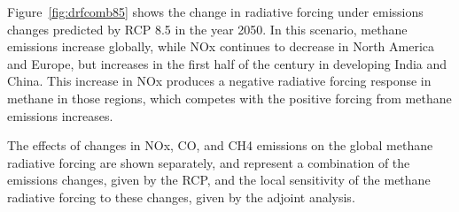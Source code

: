 Figure~\ref{fig:drfcomb85} shows the change in radiative forcing under emissions changes predicted by RCP 8.5 in the year 2050. In this scenario, methane emissions increase globally, while NOx continues to decrease in North America and Europe, but increases in the first half of the century in developing India and China. This increase in NOx produces a negative radiative forcing response in methane in those regions, which competes with the positive forcing from methane emissions increases.

The effects of changes in NOx, CO, and CH4 emissions on the global methane radiative forcing are shown separately, and represent a combination of the emissions changes, given by the RCP, and the local sensitivity of the methane radiative forcing to these changes, given by the adjoint analysis.
